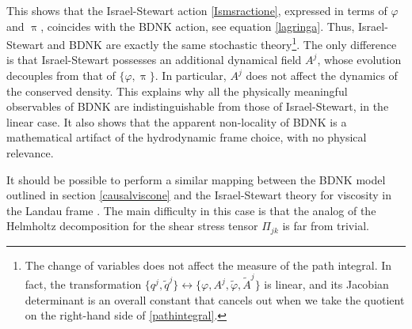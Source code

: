\documentclass[a4paper, amsfonts, amssymb, amsmath, reprint, showkeys, nofootinbib, twoside,notitlepage,onecolumn]{revtex4-2}
\newcommand{\change}[2]{{\color{red}\st{#1}}\hspace{0.1cm}{\color{blue} \uwave{#2}}}
\theoremstyle{definition}
\begin{document}
This shows that the Israel-Stewart action \eqref{Ismsractione}, expressed in terms of $\varphi$ and $\uppi$, coincides with the BDNK action, see equation \eqref{lagringa}. Thus, Israel-Stewart and BDNK are exactly the same stochastic theory\footnote{The change of variables does not affect the measure of the path integral. In fact, the transformation $\{q^j,\tilde{q}^j\} \leftrightarrow \{\varphi,A^j,\tilde{\varphi},\tilde{A}^j \}$ is linear, and its Jacobian determinant is an overall constant that cancels out when we take the quotient on the right-hand side of \eqref{pathintegral}.}. The only difference is that Israel-Stewart possesses an additional dynamical field $A^j$, whose evolution decouples from that of $\{\varphi,\uppi \}$. In particular, $A^j$ does not affect the dynamics of the conserved density. This explains why all the physically meaningful observables of BDNK are indistinguishable from those of Israel-Stewart, in the linear case. It also shows that the apparent non-locality of BDNK is a mathematical artifact of the hydrodynamic frame choice, with no physical relevance.


It should be possible to perform a similar mapping between the BDNK model outlined in section \ref{causalviscone} and the Israel-Stewart theory for viscosity in the Landau frame \cite{OlsonLifsh1990}. The main difficulty in this case is that the analog of the Helmholtz decomposition for the shear stress tensor $\Pi_{jk}$ is far from trivial. 
\end{document}
